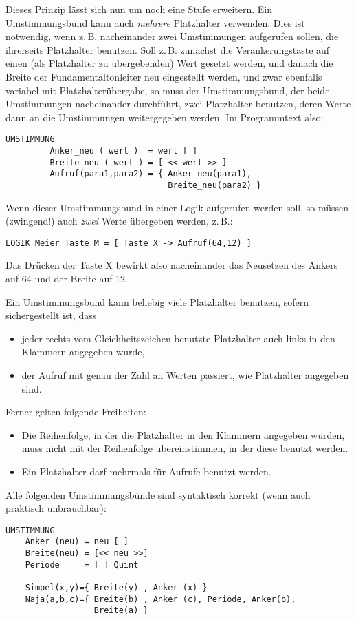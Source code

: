 Dieses Prinzip lässt sich nun um noch eine Stufe erweitern. 
Ein Umstimmungsbund kann auch \emph{mehrere} Platzhalter verwenden. 
Dies ist notwendig, wenn z.\,B. nacheinander zwei Umstimmungen aufgerufen 
sollen, die ihrerseits Platzhalter benutzen. Soll z.\,B. zunächst die 
Verankerungstaste auf einen (als Platzhalter zu übergebenden) Wert gesetzt 
werden, und danach die Breite der Fundamentaltonleiter neu eingestellt 
werden, und zwar ebenfalls variabel mit Platzhalterübergabe, so muss der 
Umstimmungsbund, der beide Umstimmungen nacheinander durchführt, zwei 
Platzhalter benutzen, deren Werte dann an die Umstimmungen weitergegeben 
werden. Im Programmtext also:
\begin{verbatim}
UMSTIMMUNG
         Anker_neu ( wert )  = wert [ ]
         Breite_neu ( wert ) = [ << wert >> ]
         Aufruf(para1,para2) = { Anker_neu(para1),
                                 Breite_neu(para2) }
\end{verbatim}
Wenn dieser Umstimmungsbund in einer Logik aufgerufen werden soll, 
so müssen (zwingend!) auch \emph{zwei} Werte übergeben werden, z.\,B.:
\begin{verbatim}
LOGIK Meier Taste M = [ Taste X -> Aufruf(64,12) ]
\end{verbatim}
Das Drücken der Taste X bewirkt also nacheinander das Neusetzen des 
Ankers auf 64 und der Breite auf 12.

Ein Umstimmungsbund kann beliebig viele Platzhalter benutzen, sofern 
sichergestellt ist, dass
\begin{itemize}
\item jeder rechts vom Gleichheitszeichen benutzte Platzhalter auch links in 
den Klammern angegeben wurde,
\item der Aufruf mit genau der Zahl an Werten passiert, wie 
Platzhalter angegeben sind.
\end{itemize}

Ferner gelten folgende Freiheiten:
\begin{itemize} 
\item Die Reihenfolge, in der die Platzhalter in den Klammern angegeben 
wurden, muss nicht mit der Reihenfolge übereinstimmen, in der diese 
benutzt werden.
\item Ein Platzhalter darf mehrmals für Aufrufe benutzt werden.
\end{itemize}

Alle folgenden Umstimmungsbünde sind syntaktisch korrekt (wenn auch 
praktisch unbrauchbar):
\begin{verbatim}
UMSTIMMUNG
    Anker (neu) = neu [ ]
    Breite(neu) = [<< neu >>]
    Periode     = [ ] Quint

    Simpel(x,y)={ Breite(y) , Anker (x) }
    Naja(a,b,c)={ Breite(b) , Anker (c), Periode, Anker(b),
                  Breite(a) }
\end{verbatim}


